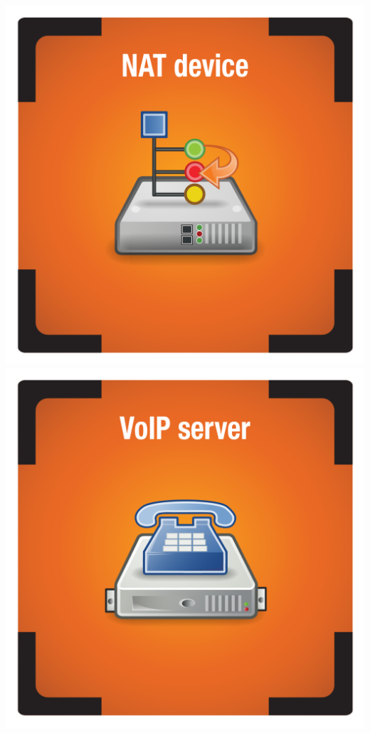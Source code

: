 \documentclass{letter}
\begin{document}
\includegraphics{tiles/node_nat_device_compromised}
\includegraphics{tiles/node_voip_server_compromised} \\
\end{document}
